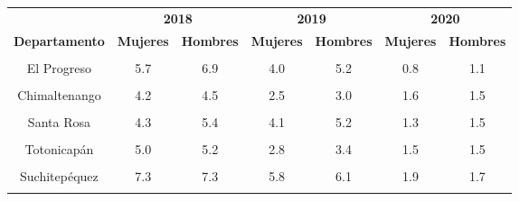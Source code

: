 \begin{tabular}[t]{ccccccc}
\toprule
\multicolumn{1}{c}{\textbf{ }} & \multicolumn{2}{c}{\textbf{2018}} & \multicolumn{2}{c}{\textbf{2019}} & \multicolumn{2}{c}{\textbf{2020}} \\
\cmidrule(l{3pt}r{3pt}){2-3} \cmidrule(l{3pt}r{3pt}){4-5} \cmidrule(l{3pt}r{3pt}){6-7}
\textbf{Departamento} & \textbf{Mujeres} & \textbf{Hombres} & \textbf{Mujeres} & \textbf{Hombres} & \textbf{Mujeres} & \textbf{Hombres}\\
\midrule
\cellcolor[HTML]{B6B3FF}{Guatemala} & \cellcolor[HTML]{B6B3FF}{3.1} & \cellcolor[HTML]{B6B3FF}{3.8} & \cellcolor[HTML]{B6B3FF}{2.5} & \cellcolor[HTML]{B6B3FF}{3.3} & \cellcolor[HTML]{B6B3FF}{0.9} & \cellcolor[HTML]{B6B3FF}{1.1}\\
El Progreso & 5.7 & 6.9 & 4.0 & 5.2 & 0.8 & 1.1\\
\cellcolor[HTML]{B6B3FF}{Sacatepéquez} & \cellcolor[HTML]{B6B3FF}{3.4} & \cellcolor[HTML]{B6B3FF}{4.1} & \cellcolor[HTML]{B6B3FF}{2.4} & \cellcolor[HTML]{B6B3FF}{3.0} & \cellcolor[HTML]{B6B3FF}{1.1} & \cellcolor[HTML]{B6B3FF}{1.6}\\
Chimaltenango & 4.2 & 4.5 & 2.5 & 3.0 & 1.6 & 1.5\\
\cellcolor[HTML]{B6B3FF}{Escuintla} & \cellcolor[HTML]{B6B3FF}{7.9} & \cellcolor[HTML]{B6B3FF}{9.1} & \cellcolor[HTML]{B6B3FF}{5.9} & \cellcolor[HTML]{B6B3FF}{7.1} & \cellcolor[HTML]{B6B3FF}{1.5} & \cellcolor[HTML]{B6B3FF}{1.5}\\
Santa Rosa & 4.3 & 5.4 & 4.1 & 5.2 & 1.3 & 1.5\\
\cellcolor[HTML]{B6B3FF}{Sololá} & \cellcolor[HTML]{B6B3FF}{2.7} & \cellcolor[HTML]{B6B3FF}{3.2} & \cellcolor[HTML]{B6B3FF}{1.8} & \cellcolor[HTML]{B6B3FF}{2.1} & \cellcolor[HTML]{B6B3FF}{0.6} & \cellcolor[HTML]{B6B3FF}{0.9}\\
Totonicapán & 5.0 & 5.2 & 2.8 & 3.4 & 1.5 & 1.5\\
\cellcolor[HTML]{B6B3FF}{Quetzaltenango} & \cellcolor[HTML]{B6B3FF}{4.0} & \cellcolor[HTML]{B6B3FF}{4.6} & \cellcolor[HTML]{B6B3FF}{2.8} & \cellcolor[HTML]{B6B3FF}{3.4} & \cellcolor[HTML]{B6B3FF}{1.2} & \cellcolor[HTML]{B6B3FF}{1.3}\\
Suchitepéquez & 7.3 & 7.3 & 5.8 & 6.1 & 1.9 & 1.7\\
\cellcolor[HTML]{B6B3FF}{Retalhuleu} & \cellcolor[HTML]{B6B3FF}{6.0} & \cellcolor[HTML]{B6B3FF}{6.4} & \cellcolor[HTML]{B6B3FF}{4.1} & \cellcolor[HTML]{B6B3FF}{4.9} & \cellcolor[HTML]{B6B3FF}{1.6} & \cellcolor[HTML]{B6B3FF}{1.7}\\

\end{tabular}
